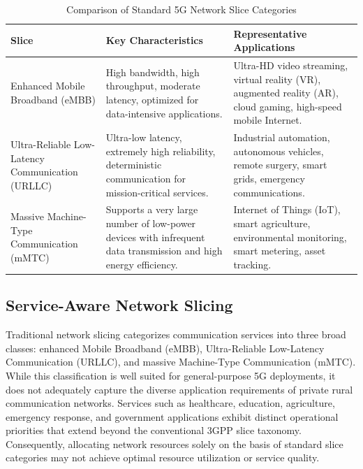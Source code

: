 \documentclass[12pt,a4paper]{report}
\begin{document}
	
\begin{table}[H]
	\centering
	\caption{Comparison of Standard 5G Network Slice Categories}
	\label{tab:slices}
	
	\begin{tabular}{|p{2.5cm}|p{5.5cm}|p{6cm}|}
		\hline
		
		\textbf{Slice} &
		\textbf{Key Characteristics} &
		\textbf{Representative Applications}
		\\
		\hline
		
		Enhanced Mobile Broadband (eMBB) &
		High bandwidth, high throughput, moderate latency, optimized for data-intensive applications. &
		Ultra-HD video streaming, virtual reality (VR), augmented reality (AR), cloud gaming, high-speed mobile Internet.
		\\
		\hline
		
		Ultra-Reliable Low-Latency Communication (URLLC) &
		Ultra-low latency, extremely high reliability, deterministic communication for mission-critical services. &
		Industrial automation, autonomous vehicles, remote surgery, smart grids, emergency communications.
		\\
		\hline
		
		Massive Machine-Type Communication (mMTC) &
		Supports a very large number of low-power devices with infrequent data transmission and high energy efficiency. &
		Internet of Things (IoT), smart agriculture, environmental monitoring, smart metering, asset tracking.
		\\
		\hline
		
	\end{tabular}
	
\end{table}
	
	\subsection{Service-Aware Network Slicing}
	
Traditional network slicing categorizes communication services into three broad classes: enhanced Mobile Broadband (eMBB), Ultra-Reliable Low-Latency Communication (URLLC), and massive Machine-Type Communication (mMTC). While this classification is well suited for general-purpose 5G deployments, it does not adequately capture the diverse application requirements of private rural communication networks. Services such as healthcare, education, agriculture, emergency response, and government applications exhibit distinct operational priorities that extend beyond the conventional 3GPP slice taxonomy. Consequently, allocating network resources solely on the basis of standard slice categories may not achieve optimal resource utilization or service quality.
\end{document}
